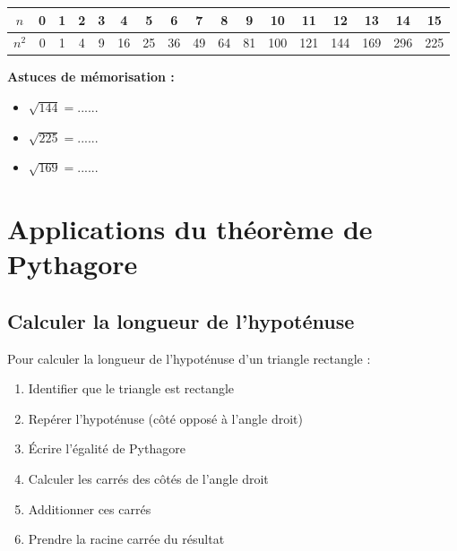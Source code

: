 \begin{examplebox}
	\begin{center}
		\begin{tabular}{|c|c|c|c|c|c|c|c|c|c|c|c|c|c|c|c|c|}
			\hline
			$n$ & 0 & 1 & 2 & 3 & 4 & 5 & 6 & 7 & 8 & 9 & 10 & 11 & 12 & 13 & 14 & 15 \\
			\hline
			$n^2$ & 0 & 1 & 4 & 9 & 16 & 25 & 36 & 49 & 64 & 81 & 100 & 121 & 144 & 169 & 296 & 225 \\
			\hline
		\end{tabular}
	\end{center}
	
	\textbf{Astuces de mémorisation :}
	\begin{itemize}
		\item $\sqrt{144} = ......$ 
		\item $\sqrt{225} = ......$
		\item $\sqrt{169} = ......$
	\end{itemize}
\end{examplebox}

\section{Applications du théorème de Pythagore}

\subsection{Calculer la longueur de l'hypoténuse}

\begin{methodebox}
	Pour calculer la longueur de l'hypoténuse d'un triangle rectangle :
	\begin{enumerate}
		\item Identifier que le triangle est rectangle
		\item Repérer l'hypoténuse (côté opposé à l'angle droit)
		\item Écrire l'égalité de Pythagore
		\item Calculer les carrés des côtés de l'angle droit
		\item Additionner ces carrés
		\item Prendre la racine carrée du résultat
	\end{enumerate}
\end{methodebox}

